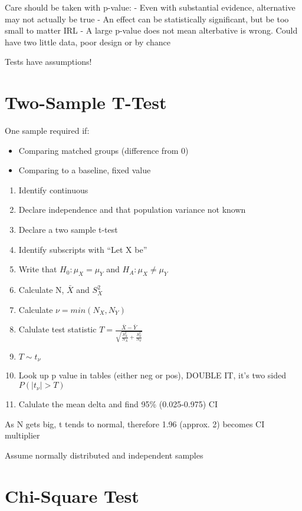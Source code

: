 \documentclass[
  letterpaper,
  DIV=11,
  numbers=noendperiod]{scrreprt}
\providecommand{\tightlist}{%
  \setlength{\itemsep}{0pt}\setlength{\parskip}{0pt}}\usepackage{longtable,booktabs,array}
\begin{document}
Care should be taken with p-value: - Even with substantial evidence,
alternative may not actually be true - An effect can be statistically
significant, but be too small to matter IRL - A large p-value does not
mean alterbative is wrong. Could have two little data, poor design or by
chance

Tests have assumptions!

\hypertarget{two-sample-t-test}{%
\section{Two-Sample T-Test}\label{two-sample-t-test}}

One sample required if:

\begin{itemize}
\tightlist
\item
  Comparing matched groups (difference from 0)
\item
  Comparing to a baseline, fixed value
\end{itemize}

\begin{enumerate}
\def\labelenumi{\arabic{enumi})}
\item
  Identify continuous
\item
  Declare independence and that population variance not known
\item
  Declare a two sample t-test
\item
  Identify subscripts with ``Let X be''
\item
  Write that \(H_0 : \mu_X = \mu_Y\) and \(H_A : \mu_X \neq \mu_Y\)
\item
  Calculate N, \(\bar{X}\) and \(S^2_X\)
\item
  Calculate \(\nu = min(N_X, N_Y)\)
\item
  Calulate test statistic
  \(T = \frac{\bar{X} - \bar{Y}}{\sqrt{\frac{S_X^2}{N_X} + \frac{S_Y^2}{N_Y}}}\)
\item
  \(T \sim t_{\nu}\)
\item
  Look up p value in tables (either neg or pos), DOUBLE IT, it's two
  sided \(P( |t_{\nu}| > T)\)
\item
  Calulate the mean delta and find 95\% (0.025-0.975) CI
\end{enumerate}

As N gets big, t tends to normal, therefore 1.96 (approx. 2) becomes CI
multiplier

Assume normally distributed and independent samples

\hypertarget{chi-square-test}{%
\section{Chi-Square Test}\label{chi-square-test}}
\end{document}
